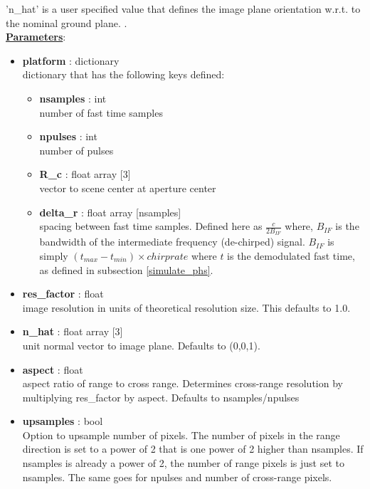 \documentclass{article}
\newcommand{\defs}[2]{\textbf{{#1}} : {#2}}
\begin{document}
'n\_hat' is a user specified value that defines the image plane orientation w.r.t. to the nominal ground plane. .\\

\noindent \underline{\textbf{Parameters}}:

\begin{itemize}
  	\item \defs{platform}{dictionary}\\
  	dictionary that has the following keys defined:
	\begin{itemize}
    	\item \defs{nsamples}{int}\\
    		number of fast time samples
	    \item \defs{npulses}{int}\\
	    	number of pulses
	    \item \defs{R\_c}{float array [3]}\\
	       	vector to scene center at aperture center
	    \item\defs{delta\_r}{float array [nsamples]}\\
	    	spacing between fast time samples.  Defined here as $\frac{c}{2B_{IF}}$ where, $B_{IF}$ is the bandwidth of the intermediate frequency (de-chirped) signal.  $B_{IF}$ is simply $(t_{max}-t_{min})\times chirprate$ where $t$ is the demodulated fast time, as defined in subsection \ref{simulate_phs}.
	\end{itemize}
	\item\defs{res\_factor}{float}\\
	image resolution in units of theoretical resolution size.  This defaults to 1.0.
	\item\defs{n\_hat}{float array [3]}\\
	unit normal vector to image plane.  Defaults to (0,0,1).
	\item\defs{aspect}{float}\\
	aspect ratio of range to cross range.  Determines cross-range resolution by multiplying res\_factor by aspect.  Defaults to nsamples/npulses
	\item\defs{upsamples}{bool}\\
	Option to upsample number of pixels.  The number of pixels in the range direction is set to a power of 2 that is one power of 2 higher than nsamples.  If nsamples is already a power of 2, the number of range pixels is just set to nsamples.  The same goes for npulses and number of cross-range pixels. 
	
\end{itemize}
\end{document}
